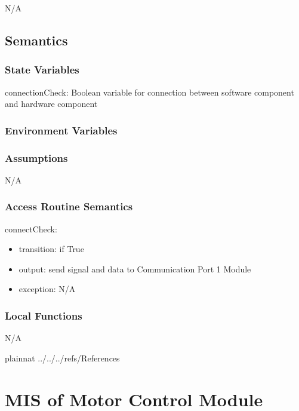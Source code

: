 \documentclass[12pt, titlepage]{article}
\begin{document}
N/A

\subsection{Semantics}

\subsubsection{State Variables}

connectionCheck: Boolean variable for connection between software component and hardware component

\subsubsection{Environment Variables}



\subsubsection{Assumptions}

N/A

\subsubsection{Access Routine Semantics}


\noindent connectCheck:
\begin{itemize}
\item transition: if True  
\item output: send signal and data to Communication Port 1 Module 
\item exception: N/A 
\end{itemize}


\subsubsection{Local Functions}

N/A

\newpage

 {plainnat}
 {../../../refs/References}

\newpage

\section{MIS of Motor Control Module} 
\end{document}
